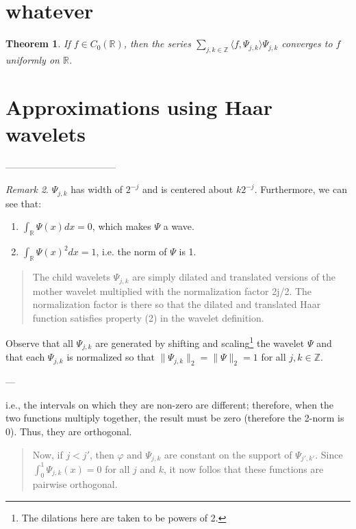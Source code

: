 \documentclass[11pt]{amsart}
\theoremstyle{theorem} %
\newtheorem{thm}{Theorem}[section] %
\theoremstyle{definition}
\theoremstyle{example}
\theoremstyle{remark}
\newtheorem{rem}[thm]{Remark}
\numberwithin{equation}{section}
\newcommand{\R}{\mathbb{R}}
\newcommand{\Z}{\mathbb{Z}}
\begin{document}
	\section{whatever}
	\begin{thm} \label{convergence}
		If $ f \in C_0(\R) $, then the series $ \sum_{j,k \in \Z} \langle f, \varPsi_{j,k} \rangle \varPsi_{j,k} $ converges to $ f $ uniformly on $ \R $.
	\end{thm}
	
	\section{Approximations using Haar wavelets}
	
	
-----------------------------------

\begin{rem}
	$ \varPsi_{j,k} $ has width of $ 2^{-j} $ and is centered about $ k 2^{-j} $. Furthermore, we can see that:
	\begin{enumerate}
		\item $ \int_{\R} \varPsi(x)dx = 0 $, which makes $ \varPsi $ a wave.
		\item  $ \int_{\R} \varPsi(x)^2dx = 1 $, i.e. the norm of $ \varPsi $ is 1.
	\end{enumerate}
\end{rem}	

\begin{quote}
	The child wavelets $ \varPsi_{j,k} $ are simply dilated and translated versions of the mother wavelet multiplied with the normalization factor 2j/2. The normalization factor is there so that the dilated and translated Haar function satisfies property (2) in the wavelet	definition.
\end{quote}

Observe that all $ \varPsi_{j,k} $ are generated by shifting and scaling\footnote{The dilations here are taken to be powers of 2.} the wavelet $ \varPsi $ and that each $ \varPsi_{j,k} $ is normalized so that $ \| \varPsi_{j,k}\|_2 = \|\varPsi\|_2 = 1 $ for all $ j,k \in \Z $.

---

i.e., the intervals on which they are non-zero are different; therefore, when the two functions multiply together, the result must be zero (therefore the 2-norm is 0). Thus, they are orthogonal. 
\begin{quote}
	Now, if $ j < j' $, then $ \varphi $ and $ \varPsi_{j,k} $ are constant on the support of $ \varPsi_{j',k'} $. Since $ \int_0^1 \varPsi_{j,k}(x) = 0 $ for all $ j $ and $ k $, it now follos that these functions are pairwise orthogonal.
\end{quote}
\end{document}
